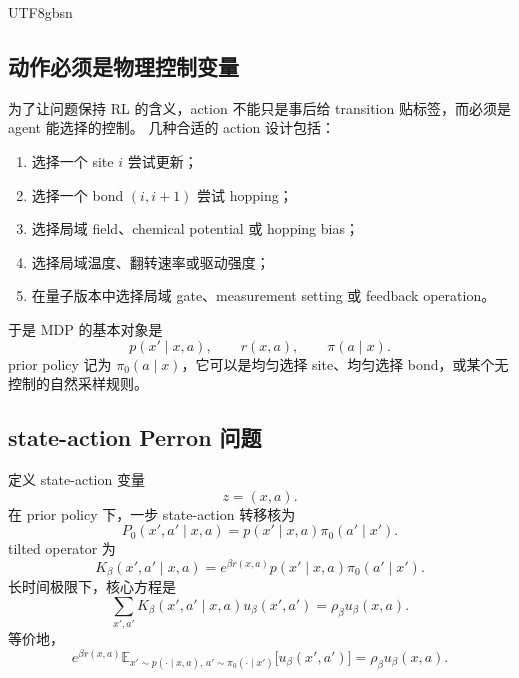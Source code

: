 \documentclass[11pt]{article}
\begin{document}
\begin{CJK*}{UTF8}{gbsn}
\subsection{动作必须是物理控制变量}

为了让问题保持 RL 的含义，action 不能只是事后给 transition 贴标签，而必须是 agent 能选择的控制。
几种合适的 action 设计包括：
\begin{enumerate}
    \item 选择一个 site \(i\) 尝试更新；
    \item 选择一个 bond \((i,i+1)\) 尝试 hopping；
    \item 选择局域 field、chemical potential 或 hopping bias；
    \item 选择局域温度、翻转速率或驱动强度；
    \item 在量子版本中选择局域 gate、measurement setting 或 feedback operation。
\end{enumerate}

于是 MDP 的基本对象是
\begin{equation}
    p(x'\mid x,a),
    \qquad
    r(x,a),
    \qquad
    \pi(a\mid x).
\end{equation}
prior policy 记为 \(\pi_0(a\mid x)\)，它可以是均匀选择 site、均匀选择 bond，或某个无控制的自然采样规则。

\subsection{state-action Perron 问题}

定义 state-action 变量
\begin{equation}
    z=(x,a).
\end{equation}
在 prior policy 下，一步 state-action 转移核为
\begin{equation}
    P_0(x',a'\mid x,a)
    =
    p(x'\mid x,a)\pi_0(a'\mid x').
    \label{eq:state-action-prior}
\end{equation}
tilted operator 为
\begin{equation}
    K_\beta(x',a'\mid x,a)
    =
    e^{\beta r(x,a)}
    p(x'\mid x,a)\pi_0(a'\mid x').
    \label{eq:state-action-tilted}
\end{equation}
长时间极限下，核心方程是
\begin{equation}
    \sum_{x',a'}
    K_\beta(x',a'\mid x,a)u_\beta(x',a')
    =
    \rho_\beta u_\beta(x,a).
    \label{eq:state-action-pf}
\end{equation}
等价地，
\begin{equation}
    e^{\beta r(x,a)}
    \mathbb E_{x'\sim p(\cdot\mid x,a),\,a'\sim\pi_0(\cdot\mid x')}
    \big[u_\beta(x',a')\big]
    =
    \rho_\beta u_\beta(x,a).
    \label{eq:conditional-pf}
\end{equation}


\end{CJK*}
\end{document}

